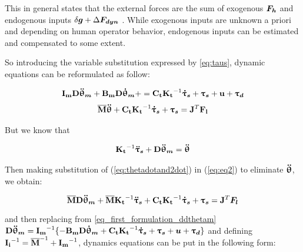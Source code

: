 This in general states that the external forces are the sum of exogenous ${ \boldsymbol {F_h}} $ and endogenous inputs  $ \delta { \boldsymbol {g}} + \Delta { \boldsymbol {F_{dyn}}}$ . While exogenous inputs are unknown a priori and depending on human operator behavior, endogenous inputs can be estimated and compensated to some extent.

So introducing the variable substitution expressed by \eqref{eq:taus}, dynamic equations can be reformulated as follow:

\setlength{\arraycolsep}{0.0em}
\begin{eqnarray}
\label{eq:eq1}
\vectm{I_m  D} \vects{\ddot{\uptheta}_m} + \vectm{B_m  D}  \vects{\dot{\uptheta}_m} += \vectm{C_t} \vectm{K_t}^{-1} \vects{\dot{\uptau}_s} + \vects{\uptau_s} + \vect{u} + \vects{\uptau_d} \label{eq_first_formulation_ddthetam}
\end{eqnarray}
\begin{eqnarray}
\label{eq:eq2}
{\vectm{\overline{M}}} \vects{\ddot{\uptheta}}  +  \vectm{C_t} \vectm{K_t}^{-1} \vects{\dot{\uptau}_s} + \vects{\uptau_s} = \vectm{J}^T  \vect{F_{l}}
\end{eqnarray}
\setlength{\arraycolsep}{5pt}

But we know that

\begin{equation}
\label{eq:thetadotand2dot}
\begin{aligned}
\vectm{K_t}^{-1}\vects{\ddot{\uptau}_s} + \vectm{D} \vects{\ddot{\uptheta}_m}  & =   \vects{\ddot{\uptheta}}  \\
\end{aligned}
\end{equation}

Then making substitution of (\ref{eq:thetadotand2dot}) in  (\ref{eq:eq2}) to eliminate $ { \boldsymbol {\ddot{\uptheta}}}$, we obtain:

\begin{equation}
\overline{\mathbf{M}} \mathbf{ D}{ \boldsymbol {\ddot{\uptheta}_m }} + \overline{\mathbf{M}}\mathbf{ K_t}^{-1} { \boldsymbol {\ddot{\uptau}_s}} + \mathbf{C_t} \mathbf{K_t}^{-1} { \boldsymbol {\dot{\uptau}_s}}  + { \boldsymbol {\uptau_s}}  =  \mathbf{J}^T { \boldsymbol {F_l}}
\end{equation}

and then replacing from \eqref{eq_first_formulation_ddthetam} $\mathbf{D}{ \boldsymbol {\ddot{\uptheta}_m}}=\mathbf{I_m}^{-1} \{ -\mathbf{B_m  D}  { \boldsymbol {\dot{\uptheta}_m}} +  \mathbf{C_t} \mathbf{K_t}^{-1} { \boldsymbol {\dot{\uptau}_s}} + { \boldsymbol {\uptau_s}} +{ \boldsymbol {u}}  +{ \boldsymbol {\uptau_d}} \} $
and defining  $\mathbf{I_i}^{-1}= \overline{\mathbf{M}}^{-1}+\mathbf{I_m}^{-1}$,  dynamics equations can be put in the following form:





